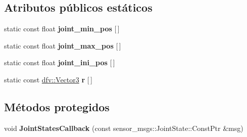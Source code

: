 \subsection*{\-Atributos públicos estáticos}
\begin{DoxyCompactItemize}
\item 
\hypertarget{classdfv_1_1Youbot_a05630a8b60d8ce1f096c32d119b1be59}{static const float {\bfseries joint\-\_\-min\-\_\-pos} \mbox{[}$\,$\mbox{]}}\label{classdfv_1_1Youbot_a05630a8b60d8ce1f096c32d119b1be59}

\item 
\hypertarget{classdfv_1_1Youbot_aafc2bd5c8d101ba0efea54e4c403d91a}{static const float {\bfseries joint\-\_\-max\-\_\-pos} \mbox{[}$\,$\mbox{]}}\label{classdfv_1_1Youbot_aafc2bd5c8d101ba0efea54e4c403d91a}

\item 
\hypertarget{classdfv_1_1Youbot_ac51315d85fd33415400aa7ce942b45ef}{static const float {\bfseries joint\-\_\-ini\-\_\-pos} \mbox{[}$\,$\mbox{]}}\label{classdfv_1_1Youbot_ac51315d85fd33415400aa7ce942b45ef}

\item 
\hypertarget{classdfv_1_1Youbot_a594b3f376aa5872a821f62d0e968028e}{static const \hyperlink{classdfv_1_1Vector3}{dfv\-::\-Vector3} {\bfseries r} \mbox{[}$\,$\mbox{]}}\label{classdfv_1_1Youbot_a594b3f376aa5872a821f62d0e968028e}

\end{DoxyCompactItemize}
\subsection*{\-Métodos protegidos}
\begin{DoxyCompactItemize}
\item 
\hypertarget{classdfv_1_1Youbot_addea2f360258a2c60e12119a3c4d944b}{void {\bfseries \-Joint\-States\-Callback} (const sensor\-\_\-msgs\-::\-Joint\-State\-::\-Const\-Ptr \&msg)}\label{classdfv_1_1Youbot_addea2f360258a2c60e12119a3c4d944b}

\end{DoxyCompactItemize}
